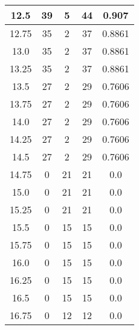 \documentclass[letterpaper, 12pt]{article}
\begin{document}
\begin{longtable}{|c|c|c|c|c|}
12.5 & 39 & 5 & 44 & 0.907 \\
\hline
12.75 & 35 & 2 & 37 & 0.8861 \\
\hline
13.0 & 35 & 2 & 37 & 0.8861 \\
\hline
13.25 & 35 & 2 & 37 & 0.8861 \\
\hline
13.5 & 27 & 2 & 29 & 0.7606 \\
\hline
13.75 & 27 & 2 & 29 & 0.7606 \\
\hline
14.0 & 27 & 2 & 29 & 0.7606 \\
\hline
14.25 & 27 & 2 & 29 & 0.7606 \\
\hline
14.5 & 27 & 2 & 29 & 0.7606 \\
\hline
14.75 & 0 & 21 & 21 & 0.0 \\
\hline
15.0 & 0 & 21 & 21 & 0.0 \\
\hline
15.25 & 0 & 21 & 21 & 0.0 \\
\hline
15.5 & 0 & 15 & 15 & 0.0 \\
\hline
15.75 & 0 & 15 & 15 & 0.0 \\
\hline
16.0 & 0 & 15 & 15 & 0.0 \\
\hline
16.25 & 0 & 15 & 15 & 0.0 \\
\hline
16.5 & 0 & 15 & 15 & 0.0 \\
\hline
16.75 & 0 & 12 & 12 & 0.0 \\
\hline
\end{longtable}
\end{document}
